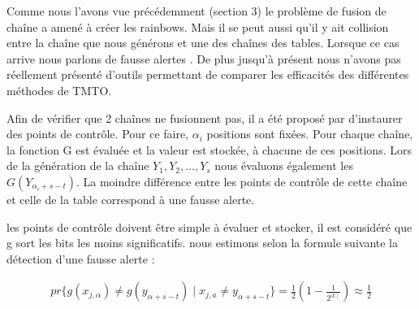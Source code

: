 
	Comme nous l'avons vue précédemment (section 3) le problème de fusion de chaîne a amené à créer les \glspl{rainbow}. Mais il se peut aussi qu'il y ait collision entre la chaîne que nous générons et une des chaînes des tables. Lorsque ce cas arrive nous parlons de fausse alertes \cite{checkpoints}.
	De plus jusqu'à présent nous n'avons pas réellement présenté d'outils permettant de comparer les efficacités des différentes méthodes de \gls{TMTO}.


	Afin de vérifier que 2 chaînes ne fusionnent pas, il a été proposé par \cite{checkpoints} d'instaurer des points de contrôle. Pour ce faire, $\alpha_i$ positions sont fixées. Pour chaque chaîne, la fonction G est évaluée et la valeur est stockée, à chacune de ces positions. Lors de la génération de la chaîne $Y_1,Y_2,\ldots{},Y_s$ nous évaluons également les $G(Y_{\alpha_i+s-t})$. La moindre différence entre les points de contrôle de cette chaîne et celle de la table correspond à une fausse alerte.

	\bigskip

	les points de contrôle doivent être simple à évaluer et stocker, il est considéré que g sort les bits les moins significatifs. nous estimons selon la formule suivante la détection d'une fausse alerte :

	\begin{align*}
	pr\{g(x_{j,\alpha}) \neq g(y_{\alpha +s-t}) \mid x_{j,a} \neq y_{\alpha+s-t}\}=\frac{1}{2}(1-\frac{1}{2^{\mid k \mid}}) \approx \frac{1}{2}
	\end{align*}

